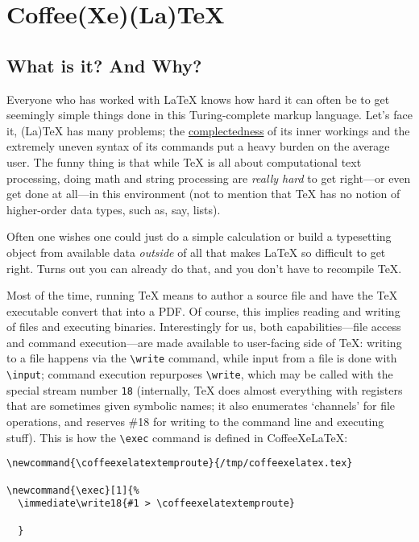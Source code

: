 \section{Coffee(Xe)(La)TeX}\label{coffeexelatex}

\subsection{What is it? And Why?}\label{what-is-it-and-why}

Everyone who has worked with LaTeX knows how hard it can often be to get
seemingly simple things done in this Turing-complete markup language.
Let's face it, (La)TeX has many problems; the
\href{http://www.infoq.com/presentations/Simple-Made-Easy}{complectedness}
of its inner workings and the extremely uneven syntax of its commands
put a heavy burden on the average user. The funny thing is that while
TeX is all about computational text processing, doing math and string
processing are \emph{really hard} to get right---or even get done at
all---in this environment (not to mention that TeX has no notion of
higher-order data types, such as, say, lists).

Often one wishes one could just do a simple calculation or build a
typesetting object from available data \emph{outside} of all that makes
LaTeX so difficult to get right. Turns out you can already do that, and
you don't have to recompile TeX.

Most of the time, running TeX means to author a source file and have the
TeX executable convert that into a PDF. Of course, this implies reading
and writing of files and executing binaries. Interestingly for us, both
capabilities---file access and command execution---are made available to
user-facing side of TeX: writing to a file happens via the
\texttt{\textbackslash{}write} command, while input from a file is done
with \texttt{\textbackslash{}input}; command execution repurposes
\texttt{\textbackslash{}write}, which may be called with the special
stream number \texttt{18} (internally, TeX does almost everything with
registers that are sometimes given symbolic names; it also enumerates
`channels' for file operations, and reserves \#18 for writing to the
command line and executing stuff). This is how the
\texttt{\textbackslash{}exec} command is defined in CoffeeXeLaTeX:

\begin{verbatim}
\newcommand{\coffeexelatextemproute}{/tmp/coffeexelatex.tex}

\newcommand{\exec}[1]{%
  \immediate\write18{#1 > \coffeexelatextemproute}
  
  }
\end{verbatim}

